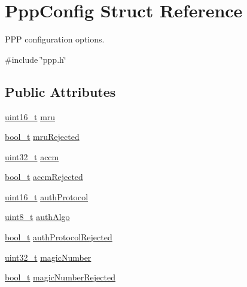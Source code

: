 \hypertarget{structPppConfig}{}\section{Ppp\+Config Struct Reference}
\label{structPppConfig}


P\+PP configuration options.  




{\ttfamily \#include \char`\"{}ppp.\+h\char`\"{}}

\subsection*{Public Attributes}
\begin{DoxyCompactItemize}
\item 
\hyperlink{stdint_8h_a273cf69d639a59973b6019625df33e30}{uint16\+\_\+t} \hyperlink{structPppConfig_a14db665ffdc3ab8fc29cbd32faa1c455}{mru}
\item 
\hyperlink{compiler__port_8h_a812d16e5494522586b3784e55d479912}{bool\+\_\+t} \hyperlink{structPppConfig_acf9af98e40ebbea526bed39eb5a76360}{mru\+Rejected}
\item 
\hyperlink{stdint_8h_a435d1572bf3f880d55459d9805097f62}{uint32\+\_\+t} \hyperlink{structPppConfig_a92e4153256daee6e4f282f5d34b49cc0}{accm}
\item 
\hyperlink{compiler__port_8h_a812d16e5494522586b3784e55d479912}{bool\+\_\+t} \hyperlink{structPppConfig_a46712771d717f5c45763ff34df2cc431}{accm\+Rejected}
\item 
\hyperlink{stdint_8h_a273cf69d639a59973b6019625df33e30}{uint16\+\_\+t} \hyperlink{structPppConfig_aee8588570fbb615a08849fc6f34cdce7}{auth\+Protocol}
\item 
\hyperlink{stdint_8h_aba7bc1797add20fe3efdf37ced1182c5}{uint8\+\_\+t} \hyperlink{structPppConfig_a60bdf669d3bb035e102b9521e3c7d880}{auth\+Algo}
\item 
\hyperlink{compiler__port_8h_a812d16e5494522586b3784e55d479912}{bool\+\_\+t} \hyperlink{structPppConfig_a9d6b8dc627521b196c855a59e4989e92}{auth\+Protocol\+Rejected}
\item 
\hyperlink{stdint_8h_a435d1572bf3f880d55459d9805097f62}{uint32\+\_\+t} \hyperlink{structPppConfig_a5379f3472512e2da57444f37419b3c9d}{magic\+Number}
\item 
\hyperlink{compiler__port_8h_a812d16e5494522586b3784e55d479912}{bool\+\_\+t} \hyperlink{structPppConfig_a6ab4dc6247e97ec52863a6ff545bc929}{magic\+Number\+Rejected}
\item 

\end{DoxyCompactItemize}
